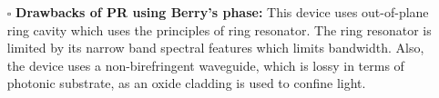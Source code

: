 \documentclass[../report.tex]{subfiles}
\begin{document}
\begin{itemize}[leftmargin=*]
		\item[$\square$] \textbf{Drawbacks of PR using Berry's phase:}
		This device uses out-of-plane ring cavity which uses the principles of ring resonator. The ring resonator is limited by its narrow band spectral features which limits bandwidth. Also, the device uses a non-birefringent waveguide, which is lossy in terms of photonic substrate, as an oxide cladding is used to confine light. 	
	\end{itemize}
\end{document}
